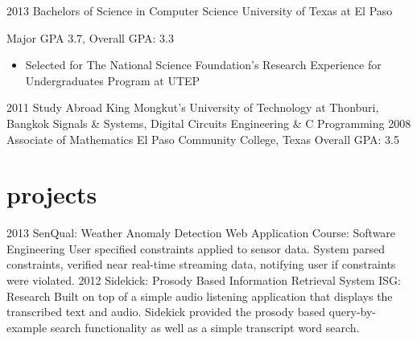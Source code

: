 \documentclass[]{friggeri-cv} %
\begin{document}
\begin{entrylist}
\entry
{2013}
{Bachelors {\normalfont of Science in Computer Science}}
{University of Texas at El Paso}
{Major GPA 3.7, Overall GPA: 3.3
\begin{itemize}
\item Selected for The National Science Foundation's Research Experience for Undergraduates Program at UTEP
\end{itemize}}
\entry
{2011}
{{\normalfont Study Abroad}}
{King Mongkut’s University of Technology at Thonburi, Bangkok}
{Signals \& Systems, Digital Circuits Engineering \& C Programming}
\entry
{2008}
{Associate {\normalfont of Mathematics}}
{El Paso Community College, Texas}
{Overall GPA: 3.5}
\end{entrylist}


\section{projects}

\begin{entrylist}
\entry
{2013}
{SenQual: Weather Anomaly Detection Web Application}
{Course: Software Engineering}
{User specified constraints applied to sensor data. System parsed constraints, verified near real-time streaming data, notifying user if constraints were violated.}
\entry
{2012}
{Sidekick: Prosody Based Information Retrieval System}
{ISG: Research}
{Built on top of a simple audio listening application that displays the transcribed text and audio. Sidekick provided the prosody based query-by-example search functionality as well as a simple transcript word search.}
\end{entrylist}
\end{document}
